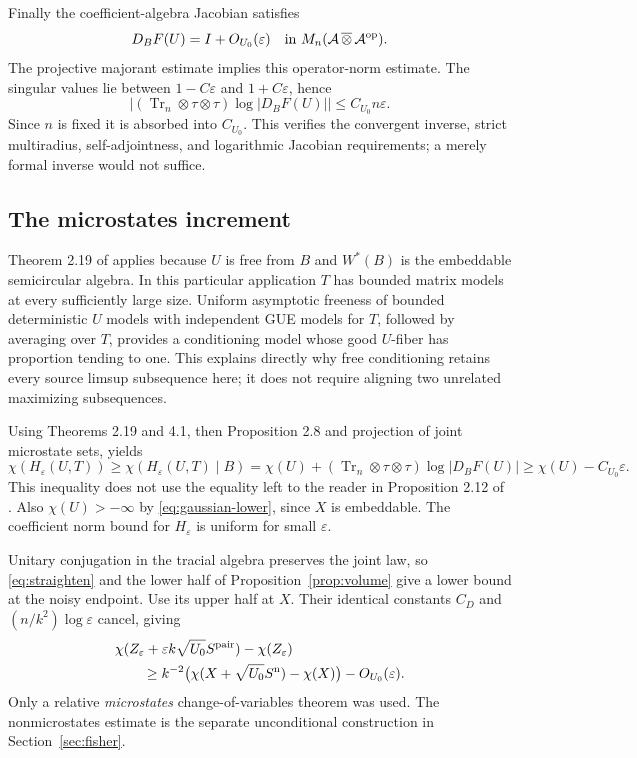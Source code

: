 \documentclass[11pt]{article}
\theoremstyle{definition}\newtheorem{definition}[theorem]{Definition}
\theoremstyle{remark}\newtheorem{remark}[theorem]{Remark}
\DeclareMathOperator{\Tr}{Tr}\DeclareMathOperator{\tr}{tr}
\newcommand{\eps}{\varepsilon}\newcommand{\id}{\mathrm{id}}
\begin{document}
Finally the coefficient-algebra Jacobian satisfies
\[
 D_BF(U)=I+O_{U_0}(\eps)
 \quad\hbox{in }M_n(\mathcal A\,\overline\otimes\,\mathcal A^{\op}).
\]
The projective majorant estimate implies this operator-norm estimate.
The singular values lie between $1-C\eps$ and $1+C\eps$, hence
\begin{equation}\label{eq:logjac}
 \big|(\Tr_n\otimes\tau\otimes\tau)\log|D_BF(U)|\big|
 \leq C_{U_0}n\eps.
\end{equation}
Since $n$ is fixed it is absorbed into $C_{U_0}$.
This verifies the convergent inverse, strict multiradius,
self-adjointness, and logarithmic Jacobian requirements; a merely
formal inverse would not suffice.

\subsection{The microstates increment}
Theorem 2.19 of \cite{Shly} applies because $U$ is free from $B$ and
$W^*(B)$ is the embeddable semicircular algebra. In this particular
application $T$ has bounded matrix models at every sufficiently large
size. Uniform asymptotic freeness of bounded deterministic $U$ models
with independent GUE models for $T$, followed by averaging over $T$,
provides a conditioning model whose good $U$-fiber has proportion
tending to one. This explains directly why free conditioning retains
every source limsup subsequence here; it does not require aligning two
unrelated maximizing subsequences.

Using Theorems 2.19 and 4.1, then Proposition 2.8 and projection of
joint microstate sets, yields
\begin{equation}\label{eq:H-entropy}
 \chi(H_\eps(U,T))\geq\chi(H_\eps(U,T)\mid B)
 =\chi(U)+(\Tr_n\otimes\tau\otimes\tau)\log|D_BF(U)|
 \geq\chi(U)-C_{U_0}\eps.
\end{equation}
This inequality does not use the equality left to the reader in
Proposition 2.12 of \cite{Shly}. Also $\chi(U)>-\infty$ by
\eqref{eq:gaussian-lower}, since $X$ is embeddable.
The coefficient norm bound for $H_\eps$ is uniform for small $\eps$.

Unitary conjugation in the tracial algebra preserves the joint law,
so \eqref{eq:straighten} and the lower half of
Proposition~\ref{prop:volume} give a lower bound at the noisy endpoint.
Use its upper half at $X$. Their identical constants $C_D$ and
$(n/k^2)\log\eps$ cancel, giving
\begin{align}
 &\chi(Z_\eps+\eps k\sqrt{U_0}S^{\rm pair})-\chi(Z_\eps)
 \notag\\
 &\qquad\geq k^{-2}\big(\chi(X+\sqrt{U_0}S^{\rm n})-\chi(X)\big)
                   -O_{U_0}(\eps).
 \label{eq:micro-increment}
\end{align}
Only a relative \emph{microstates} change-of-variables theorem was
used. The nonmicrostates estimate is the separate unconditional
construction in Section~\ref{sec:fisher}.
\end{document}
